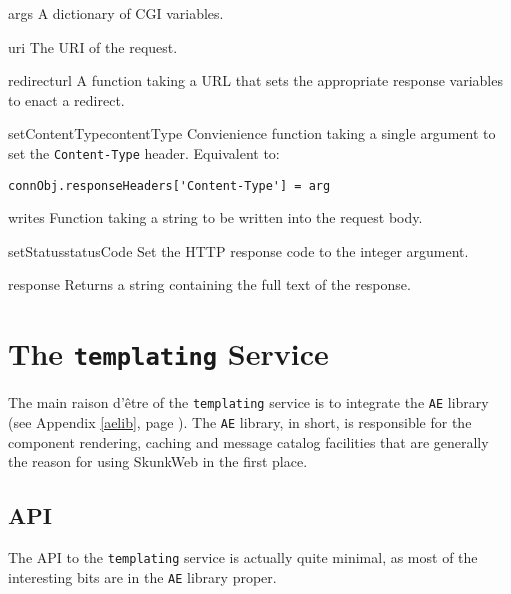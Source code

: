 \documentclass{manual}
\begin{document}
\begin{memberdesc}[dictionary]{args} A dictionary of CGI variables.
\end{memberdesc}
\begin{memberdesc}[string]{uri} The URI of the request.
\end{memberdesc}

\begin{methoddesc}{redirect}{url}  A function taking a URL that sets the appropriate response
variables to enact a redirect.  
\end{methoddesc}
\begin{methoddesc}{setContentType}{contentType}  Convienience function taking a single argument
to set the \texttt{Content-Type} header.  Equivalent to:
\begin{verbatim}
connObj.responseHeaders['Content-Type'] = arg
\end{verbatim}
\end{methoddesc}
\begin{methoddesc}{write}{s} Function taking a string to be written into the request body.
\end{methoddesc}
\begin{methoddesc}{setStatus}{statusCode} Set the HTTP response code to the integer argument.
\end{methoddesc}
\begin{methoddesc}{response}{} Returns a string containing the full text of the response.
\end{methoddesc}

\chapter{The \texttt{templating} Service}
The main raison d'\^etre of the \texttt{templating} service is to
integrate the \texttt{AE} library (see Appendix \ref{aelib}, page
\pageref{aelib}).  The \texttt{AE} library, in short, is responsible
for the component rendering, caching and message catalog facilities
that are generally the reason for using SkunkWeb in the first place.


\section{API}
The API to the \texttt{templating} service is actually quite minimal,
as most of the interesting bits are in the \texttt{AE} library proper.
\end{document}
